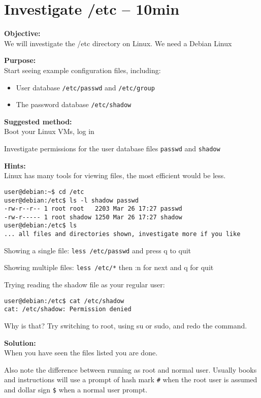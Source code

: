 \documentclass[a4paper,11pt,notitlepage]{report}
\begin{document}
\chapter{Investigate /etc -- 10min}
\label{ex:sw-basicLinuxetc}


{\bf Objective:}\\
We will investigate the /etc directory on Linux. We need a Debian Linux

{\bf Purpose:}\\
Start seeing example configuration files, including:
\begin{itemize}
  \item User database \verb+/etc/passwd+ and \verb+/etc/group+
  \item The password database \verb+/etc/shadow+
\end{itemize}

{\bf Suggested method:}\\
Boot your Linux VMs, log in

Investigate permissions for the user database files \verb+passwd+ and \verb+shadow+

{\bf Hints:}\\
Linux has many tools for viewing files, the most efficient would be less.

\begin{verbatim}
user@debian:~$ cd /etc
user@debian:/etc$ ls -l shadow passwd
-rw-r--r-- 1 root root   2203 Mar 26 17:27 passwd
-rw-r----- 1 root shadow 1250 Mar 26 17:27 shadow
user@debian:/etc$ ls
... all files and directories shown, investigate more if you like
\end{verbatim}

Showing a single file: \verb+less /etc/passwd+ and press q to quit

Showing multiple files: \verb+less /etc/*+ then :n for next and q for quit

Trying reading the shadow file as your regular user:
\begin{verbatim}
user@debian:/etc$ cat /etc/shadow
cat: /etc/shadow: Permission denied
\end{verbatim}

Why is that? Try switching to root, using su or sudo, and redo the command.

{\bf Solution:}\\
When you have seen the files listed you are done.

Also note the difference between running as root and normal user. Usually books and instructions will use a prompt of hash mark \verb+#+ when the root user is assumed and dollar sign \verb+$+ when a normal user prompt.
\end{document}
